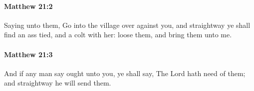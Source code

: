 		\paragraph{Matthew 21:2} %
			\label{MATTHEW-21-2}

			Saying unto them, Go into the village over against you, and straightway ye shall find an ass tied, and a colt with her: loose them, and bring them unto me.

			\begin{framed}
			\scriptsize
				\begin{compactdesc}
					\item[SBLG] 
				\end{compactdesc}
			\end{framed}

		\paragraph{Matthew 21:3} %
			\label{MATTHEW-21-3}

			And if any man say ought unto you, ye shall say, The Lord hath need of them; and straightway he will send them.

